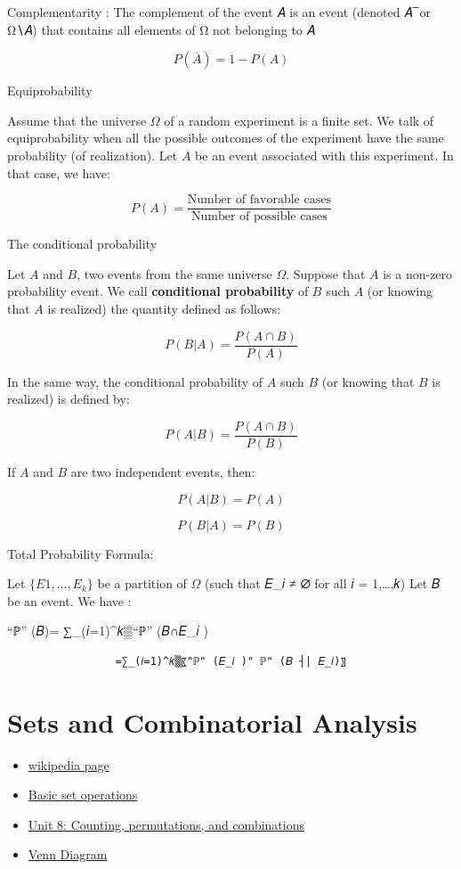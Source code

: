 \documentclass[
  letterpaper,
  DIV=11,
  numbers=noendperiod]{scrreprt}
\providecommand{\tightlist}{%
  \setlength{\itemsep}{0pt}\setlength{\parskip}{0pt}}\usepackage{longtable,booktabs,array}
\begin{document}
Complementarity : The complement of the event 𝐴 is an event (denoted 𝐴~̅
or Ω∖𝐴) that contains all elements of Ω not belonging to 𝐴

\[P(\overline{A}) = 1 - P(A)\]

Equiprobability

Assume that the universe \(\Omega\) of a random experiment is a finite
set. We talk of equiprobability when all the possible outcomes of the
experiment have the same probability (of realization). Let \(A\) be an
event associated with this experiment. In that case, we have:

\[P(𝐴) = \frac{\text{Number of favorable cases}}{\text{Number of possible cases}}\]

The conditional probability

Let \(A\) and \(B\), two events from the same universe \(\Omega\).
Suppose that \(A\) is a non-zero probability event. We call
\textbf{conditional probability} of \(B\) such \(A\) (or knowing that
\(A\) is realized) the quantity defined as follows:

\[P(B \vert A) = \frac{P(A \cap B)}{P(A)}\]

In the same way, the conditional probability of \(A\) such \(B\) (or
knowing that \(B\) is realized) is defined by:

\[P(A \vert B) = \frac{P(A \cap B)}{P(B)}\]

If \(A\) and \(B\) are two independent events, then:

\[P(A \vert B) = P(𝐴)\]

\[P(B \vert A) = P(B)\]

Total Probability Formula:

Let \(\{𝐸1, ..., 𝐸_𝑘\}\) be a partition of \(\Omega\) (such that 𝐸\_𝑖 ≠
∅ for all 𝑖 = 1,\ldots,𝑘) Let 𝐵 be an event. We have :

``ℙ'' (𝐵)= ∑\_(𝑖=1)\^{}𝑘▒``ℙ'' (𝐵∩𝐸\_𝑖 )

\begin{verbatim}
                 =∑_(𝑖=1)^𝑘▒〖"ℙ" (𝐸_𝑖 )" ℙ" (𝐵 ┤| 𝐸_𝑖)〗
\end{verbatim}

\section{Sets and Combinatorial
Analysis}\label{sets-and-combinatorial-analysis}

\begin{itemize}
\tightlist
\item
  \href{https://en.wikipedia.org/wiki/Set_(mathematics)\#cite_ref-Cantor_1-0}{wikipedia
  page}
\item
  \href{https://www.khanacademy.org/math/statistics-probability/probability-library/basic-set-ops/v/intersection-and-union-of-sets}{Basic
  set operations}
\item
  \href{https://www.khanacademy.org/math/statistics-probability/counting-permutations-and-combinations}{Unit
  8: Counting, permutations, and combinations}
\item
  \href{https://r-graph-gallery.com/venn-diagram.html}{Venn Diagram}
\end{itemize}
\end{document}
